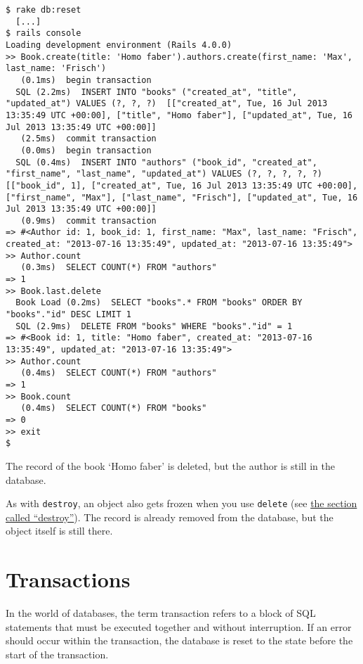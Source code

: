 \documentclass[a4paper]{book}
\newcounter{tab}[chapter]
\begin{document}
\begin{shaded}\begin{verbatim}
$ rake db:reset
  [...]
$ rails console
Loading development environment (Rails 4.0.0)
>> Book.create(title: 'Homo faber').authors.create(first_name: 'Max', last_name: 'Frisch')
   (0.1ms)  begin transaction
  SQL (2.2ms)  INSERT INTO "books" ("created_at", "title", "updated_at") VALUES (?, ?, ?)  [["created_at", Tue, 16 Jul 2013 13:35:49 UTC +00:00], ["title", "Homo faber"], ["updated_at", Tue, 16 Jul 2013 13:35:49 UTC +00:00]]
   (2.5ms)  commit transaction
   (0.0ms)  begin transaction
  SQL (0.4ms)  INSERT INTO "authors" ("book_id", "created_at", "first_name", "last_name", "updated_at") VALUES (?, ?, ?, ?, ?)  [["book_id", 1], ["created_at", Tue, 16 Jul 2013 13:35:49 UTC +00:00], ["first_name", "Max"], ["last_name", "Frisch"], ["updated_at", Tue, 16 Jul 2013 13:35:49 UTC +00:00]]
   (0.9ms)  commit transaction
=> #<Author id: 1, book_id: 1, first_name: "Max", last_name: "Frisch", created_at: "2013-07-16 13:35:49", updated_at: "2013-07-16 13:35:49">
>> Author.count
   (0.3ms)  SELECT COUNT(*) FROM "authors"
=> 1
>> Book.last.delete
  Book Load (0.2ms)  SELECT "books".* FROM "books" ORDER BY "books"."id" DESC LIMIT 1
  SQL (2.9ms)  DELETE FROM "books" WHERE "books"."id" = 1
=> #<Book id: 1, title: "Homo faber", created_at: "2013-07-16 13:35:49", updated_at: "2013-07-16 13:35:49">
>> Author.count
   (0.4ms)  SELECT COUNT(*) FROM "authors"
=> 1
>> Book.count
   (0.4ms)  SELECT COUNT(*) FROM "books"
=> 0
>> exit
$
\end{verbatim}\end{shaded}

The record of the book `Homo faber' is deleted, but the author is still in the database.

As with \texttt{destroy}, an object also gets frozen when you use \texttt{delete} (see \hyperref[activerecordux5fdestroy]{the section called “destroy”}). The record is already removed from the database, but the object itself is still there.

\section{Transactions}\label{transactions}

In the world of databases, the term transaction refers to a block of SQL statements that must be executed together and without interruption. If an error should occur within the transaction, the database is reset to the state before the start of the transaction.
\end{document}
